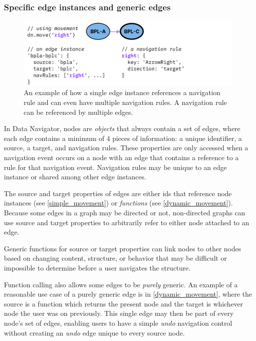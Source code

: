 \documentclass[journal]{vgtc}                %
\begin{document}
\subsubsection{Specific edge instances and generic edges}
\begin{figure}[h]
  \centering
  \includegraphics[width=\linewidth]{figures/simple_movement.png}
  \caption{An example of how a single edge instance references a navigation rule and can even have multiple navigation rules. A navigation rule can be referenced by multiple edges.}
  \label{simple_movement}
\end{figure}

In Data Navigator, nodes are \textit{objects} that always contain a set of edges, where each edge contains a minimum of 4 pieces of information: a unique identifier, a source, a target, and navigation rules. These properties are only accessed when a navigation event occurs on a node with an edge that contains a reference to a rule for that navigation event. Navigation rules may be unique to an edge instance or shared among other edge instances.

The source and target properties of edges are either ids that reference node instances (see \autoref{simple_movement}) or \textit{functions} (see \autoref{dynamic_movement}). Because some edges in a graph may be directed or not, non-directed graphs can use source and target properties to arbitrarily refer to either node attached to an edge.

Generic functions for source or target properties can link nodes to other nodes based on changing content, structure, or behavior that may be difficult or impossible to determine before a user navigates the structure.

Function calling also allows some edges to be \textit{purely} generic. An example of a reasonable use case of a purely generic edge is in \autoref{dynamic_movement}, where the source is a function which returns the present node and the target is whichever node the user was on previously. This single edge may then be part of every node's set of edges, enabling users to have a simple \textit{undo} navigation control without creating an \textit{undo} edge unique to every source node.
\end{document}
